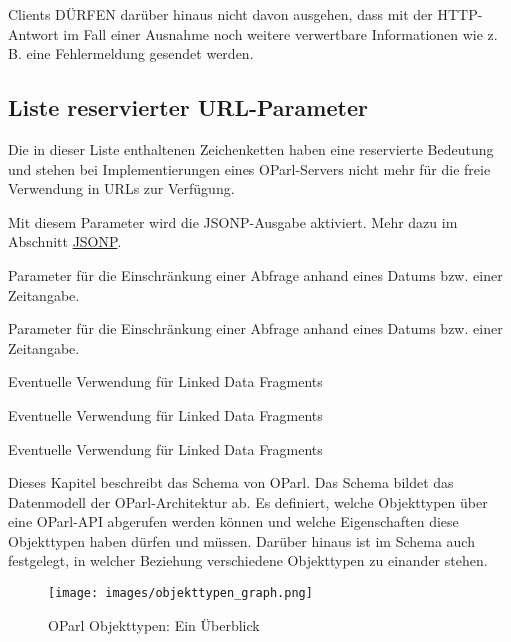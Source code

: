 \documentclass[,a4paper]{article}
\makeatletter
\def\maxwidth{\ifdim\Gin@nat@width>\linewidth\linewidth
\else\Gin@nat@width\fi}
\let\Oldincludegraphics\includegraphics
\renewcommand{\includegraphics}[1]{\Oldincludegraphics[width=\maxwidth]{#1}}
\makeatother
\begin{document}
Clients DÜRFEN darüber hinaus nicht davon ausgehen, dass mit der
HTTP-Antwort im Fall einer Ausnahme noch weitere verwertbare
Informationen wie z. B. eine Fehlermeldung gesendet werden.

\subsection{Liste reservierter
URL-Parameter}\label{liste-reservierter-url-parameter}

Die in dieser Liste enthaltenen Zeichenketten haben eine reservierte
Bedeutung und stehen bei Implementierungen eines OParl-Servers nicht
mehr für die freie Verwendung in URLs zur Verfügung.

\begin{description}
\itemsep1pt\parskip0pt
\item[\texttt{callback}:]
Mit diesem Parameter wird die JSONP-Ausgabe aktiviert. Mehr dazu im
Abschnitt \hyperref[jsonp]{JSONP}.
\item[\texttt{startdate}:]
Parameter für die Einschränkung einer Abfrage anhand eines Datums bzw.
einer Zeitangabe.
\item[\texttt{enddate}:]
Parameter für die Einschränkung einer Abfrage anhand eines Datums bzw.
einer Zeitangabe.
\item[\texttt{subject}:]
Eventuelle Verwendung für Linked Data Fragments
\item[\texttt{predicate}:]
Eventuelle Verwendung für Linked Data Fragments
\item[\texttt{object}:]
Eventuelle Verwendung für Linked Data Fragments
\end{description}


Dieses Kapitel beschreibt das Schema von OParl. Das Schema bildet das
Datenmodell der OParl-Architektur ab. Es definiert, welche Objekttypen
über eine OParl-API abgerufen werden können und welche Eigenschaften
diese Objekttypen haben dürfen und müssen. Darüber hinaus ist im Schema
auch festgelegt, in welcher Beziehung verschiedene Objekttypen zu
einander stehen.

\begin{figure}[htbp]
\centering
\texttt{[image: images/objekttypen\_graph.png]}
\caption{OParl Objekttypen: Ein Überblick}
\end{figure}
\end{document}
